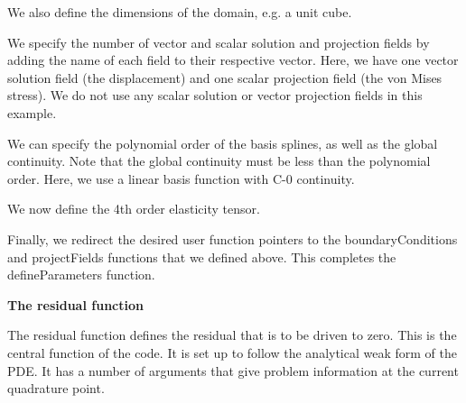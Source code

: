 \begin{DoxyCodeInclude}

\end{DoxyCodeInclude}


We also define the dimensions of the domain, e.\-g. a unit cube.


\begin{DoxyCodeInclude}

\end{DoxyCodeInclude}


We specify the number of vector and scalar solution and projection fields by adding the name of each field to their respective vector. Here, we have one vector solution field (the displacement) and one scalar projection field (the von Mises stress). We do not use any scalar solution or vector projection fields in this example.


\begin{DoxyCodeInclude}

\end{DoxyCodeInclude}


We can specify the polynomial order of the basis splines, as well as the global continuity. Note that the global continuity must be less than the polynomial order. Here, we use a linear basis function with C-\/0 continuity.


\begin{DoxyCodeInclude}

\end{DoxyCodeInclude}


We now define the 4th order elasticity tensor.


\begin{DoxyCodeInclude}

\end{DoxyCodeInclude}


Finally, we redirect the desired user function pointers to the {\ttfamily boundary\-Conditions} and {\ttfamily project\-Fields} functions that we defined above. This completes the {\ttfamily define\-Parameters} function.


\begin{DoxyCodeInclude}

\end{DoxyCodeInclude}


{\bfseries  The {\ttfamily residual} function }

The residual function defines the residual that is to be driven to zero. This is the central function of the code. It is set up to follow the analytical weak form of the P\-D\-E. It has a number of arguments that give problem information at the current quadrature point.


